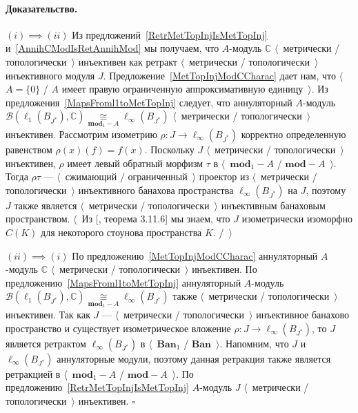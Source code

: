 \documentclass[12pt]{article}
\newcommand{\isom}[1]{\mathop{\mathbin{\cong}}\limits_{#1}}
\renewenvironment{proof}{\paragraph{Доказательство.}}{\hfill$\square$\medskip}
\begin{document}
\begin{proof} $(i)\implies (ii)$  Из предложений~\ref{RetrMetTopInjIsMetTopInj}
    и~\ref{AnnihCModIsRetAnnihMod} мы получаем, что $A$-модуль $\mathbb{C}$
    $\langle$~метрически / топологически~$\rangle$ инъективен как ретракт
    $\langle$~метрически / топологически~$\rangle$ инъективного модуля $J$.
    Предложение~\ref{MetTopInjModCCharac} дает нам, что $\langle$~$A= \{0 \}$ /
    $A$ имеет правую ограниченную аппроксимативную единицу~$\rangle$. Из
    предложения~\ref{MapsFroml1toMetTopInj} следует, что аннуляторный $A$-модуль
    $\mathcal{B}(\ell_1(B_{J^*}),\mathbb{C})
        \isom{\mathbf{mod}_1-A}\ell_\infty(B_{J^*})$
    $\langle$~метрически / топологически~$\rangle$ инъективен. Рассмотрим
    изометрию $\rho:J\to\ell_\infty(B_{J^*})$ корректно определенную равенством
    $\rho(x)(f)=f(x)$. Поскольку $J$ $\langle$~метрически /
    топологически~$\rangle$ инъективен, $\rho$ имеет левый обратный морфизм
    $\tau$ в $\langle$~$\mathbf{mod}_1-A$ / $\mathbf{mod}-A$~$\rangle$. Тогда
    $\rho\tau$ --- $\langle$~сжимающий / ограниченный~$\rangle$ проектор из
    $\langle$~метрически / топологически~$\rangle$ инъективного банахова
    пространства $\ell_\infty(B_{J^*})$ на $J$, поэтому $J$ также является
    $\langle$~метрически / топологически~$\rangle$ инъективным банаховым
    пространством. $\langle$~Из [\cite{LaceyIsomThOfClassicBanSp}, теорема
    3.11.6] мы знаем, что $J$ изометрически изоморфно $C(K)$ для некоторого
    стоунова пространства $K$. /~$\rangle$

    $(ii)\implies (i)$ По предложению~\ref{MetTopInjModCCharac} аннуляторный
    $A$-модуль $\mathbb{C}$ $\langle$~метрически / топологически~$\rangle$
    инъективен. По предложению~\ref{MapsFroml1toMetTopInj} аннуляторный
    $A$-модуль
    $\mathcal{B}(\ell_1(B_{J^*}),\mathbb{C})
        \isom{\mathbf{mod}_1-A}\ell_\infty(B_{J^*})$
    также $\langle$~метрически / топологически~$\rangle$ инъективен. Так как $J$
    --- $\langle$~метрически / топологически~$\rangle$ инъективное банахово
    пространство и существует изометрическое вложение $\rho:J\to
        \ell_\infty(B_{J^*})$, то $J$ является ретрактом $\ell_\infty(B_{J^*})$ в
    $\langle$~$\mathbf{Ban}_1$ / $\mathbf{Ban}$~$\rangle$. Напомним, что $J$ и
    $\ell_\infty(B_{J^*})$ аннуляторные модули, поэтому данная ретракция также
    является ретракцией в $\langle$~$\mathbf{mod}_1-A$ /
    $\mathbf{mod}-A$~$\rangle$. По предложению~\ref{RetrMetTopInjIsMetTopInj}
    $A$-модуль $J$ $\langle$~метрически / топологически~$\rangle$ инъективен.
\end{proof}
\end{document}
